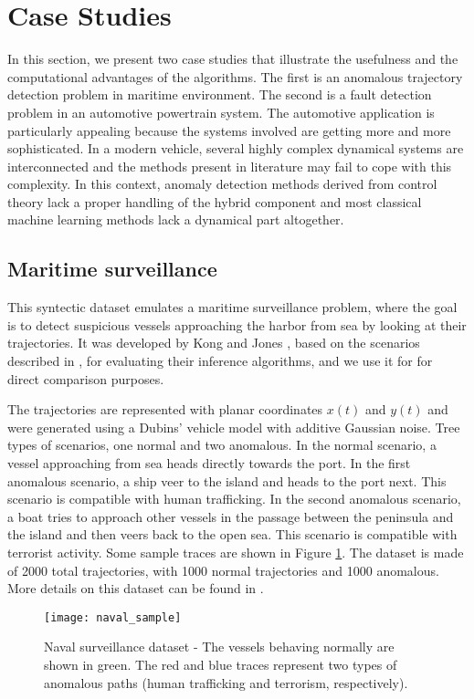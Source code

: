 \section{Case Studies}\label{sec:case_studies}
In this section, we present two case studies that illustrate the usefulness and the computational advantages of the algorithms.
The first is an anomalous trajectory detection problem in maritime environment. The second is a fault detection problem in an automotive powertrain system.
The automotive application is particularly appealing because the systems involved are getting more and more sophisticated. In a modern vehicle, several highly complex dynamical systems are interconnected and the methods present in literature may fail to cope with this complexity.
In this context, anomaly detection methods derived from control theory lack a proper handling of the hybrid component and most classical machine learning methods lack a dynamical part altogether.

\subsection{Maritime surveillance}
This syntectic dataset emulates a maritime surveillance problem, where the goal is to detect suspicious vessels approaching the harbor from sea by looking at their trajectories.
It was developed by Kong and Jones \cite{kong_temporal_2015}, based on the scenarios described in \cite{kowalska_maritime_2012}, for evaluating their inference algorithms, and we use it for for direct comparison purposes.

The trajectories are represented with planar coordinates $x(t)$ and $y(t)$ and were generated using a Dubins' vehicle model with additive Gaussian noise.
Tree types of scenarios, one normal and two anomalous. In the normal scenario, a vessel approaching from sea heads directly towards the port. In the first anomalous scenario, a ship veer to the island and heads to the port next. This scenario is compatible with human trafficking.
In the second anomalous scenario, a boat tries to approach other vessels in the passage between the peninsula and the island and then veers back to the open sea. This scenario is compatible with terrorist activity.
Some sample traces are shown in Figure \ref{fig:naval_sample}.
The dataset is made of 2000 total trajectories, with 1000 normal trajectories and 1000 anomalous.
More details on this dataset can be found in \cite{kong_temporal_2015}.
\begin{figure}
  \centering
  \texttt{[image: naval\_sample]}
  \caption{Naval surveillance dataset - The vessels behaving normally are shown in green. The red and blue traces represent two types of anomalous paths (human trafficking and terrorism, respectively).}\label{fig:naval_sample}
\end{figure}



